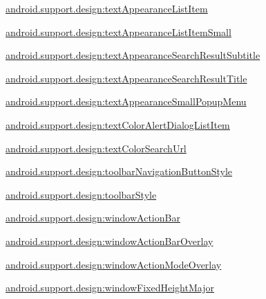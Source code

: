 {\ttfamily \hyperlink{classandroid_1_1support_1_1design_1_1R_1_1styleable_af9613bb433f8ea578ca10997d7f31384}{android.\+support.\+design\+:text\+Appearance\+List\+Item}}

{\ttfamily \hyperlink{classandroid_1_1support_1_1design_1_1R_1_1styleable_abc32a69cec9cd2518cfcbb996cbd9b21}{android.\+support.\+design\+:text\+Appearance\+List\+Item\+Small}}

{\ttfamily \hyperlink{classandroid_1_1support_1_1design_1_1R_1_1styleable_a5fb9efd1776571a8f6fb3e02b4b4602c}{android.\+support.\+design\+:text\+Appearance\+Search\+Result\+Subtitle}}

{\ttfamily \hyperlink{classandroid_1_1support_1_1design_1_1R_1_1styleable_aa3f93225ffeded406d20658eb3447964}{android.\+support.\+design\+:text\+Appearance\+Search\+Result\+Title}}

{\ttfamily \hyperlink{classandroid_1_1support_1_1design_1_1R_1_1styleable_a244ffcdac7c8cd9bada32939947ccf3d}{android.\+support.\+design\+:text\+Appearance\+Small\+Popup\+Menu}}

{\ttfamily \hyperlink{classandroid_1_1support_1_1design_1_1R_1_1styleable_abc7c2b20a8ab2fd4ce11d97bc2dcf36e}{android.\+support.\+design\+:text\+Color\+Alert\+Dialog\+List\+Item}}

{\ttfamily \hyperlink{classandroid_1_1support_1_1design_1_1R_1_1styleable_aafa1ab7dc0cc5540f3c561bc2dcdb146}{android.\+support.\+design\+:text\+Color\+Search\+Url}}

{\ttfamily \hyperlink{classandroid_1_1support_1_1design_1_1R_1_1styleable_af3d0203e79964854fe14861e072e6ff3}{android.\+support.\+design\+:toolbar\+Navigation\+Button\+Style}}

{\ttfamily \hyperlink{classandroid_1_1support_1_1design_1_1R_1_1styleable_aee082e81065a0dcd55b2dac5cf28624e}{android.\+support.\+design\+:toolbar\+Style}}

{\ttfamily \hyperlink{classandroid_1_1support_1_1design_1_1R_1_1styleable_af0d7fc989412d347b42efaf6e07fb775}{android.\+support.\+design\+:window\+Action\+Bar}}

{\ttfamily \hyperlink{classandroid_1_1support_1_1design_1_1R_1_1styleable_a8ea8126eeb9bb872aeb7fdb94d4a4db9}{android.\+support.\+design\+:window\+Action\+Bar\+Overlay}}

{\ttfamily \hyperlink{classandroid_1_1support_1_1design_1_1R_1_1styleable_add8f8ab4f925ac3f15d7337d40a9ecd8}{android.\+support.\+design\+:window\+Action\+Mode\+Overlay}}

{\ttfamily \hyperlink{classandroid_1_1support_1_1design_1_1R_1_1styleable_adda8a0798f30bcf0b35dc5ca9c4e570a}{android.\+support.\+design\+:window\+Fixed\+Height\+Major}}

